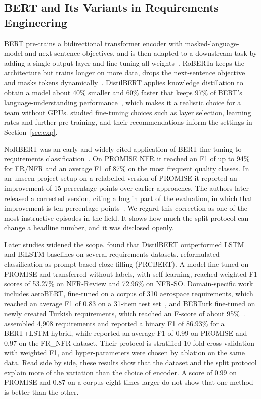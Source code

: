 \documentclass[conference,10pt,letterpaper]{IEEEtran}
\begin{document}
\subsection{BERT and Its Variants in Requirements Engineering}
BERT pre-trains a bidirectional transformer encoder with masked-language-model and next-sentence objectives, and is then adapted to a downstream task by adding a single output layer and fine-tuning all weights~\cite{devlin2019}. RoBERTa keeps the architecture but trains longer on more data, drops the next-sentence objective and masks tokens dynamically~\cite{liu2019roberta}. DistilBERT applies knowledge distillation to obtain a model about 40\% smaller and 60\% faster that keeps 97\% of BERT's language-understanding performance~\cite{sanh2019distilbert}, which makes it a realistic choice for a team without GPUs. \textcite{sun2019finetune} studied fine-tuning choices such as layer selection, learning rates and further pre-training, and their recommendations inform the settings in Section~\ref{sec:exp}.

NoRBERT was an early and widely cited application of BERT fine-tuning to requirements classification~\cite{hey2020norbert}. On PROMISE NFR it reached an F1 of up to 94\% for FR/NFR and an average F1 of 87\% on the most frequent quality classes. In an unseen-project setup on a relabelled version of PROMISE it reported an improvement of 15 percentage points over earlier approaches. The authors later released a corrected version, citing a bug in part of the evaluation, in which that improvement is ten percentage points~\cite{hey2022corrected}. We regard this correction as one of the most instructive episodes in the field. It shows how much the split protocol can change a headline number, and it was disclosed openly.

Later studies widened the scope. \textcite{kici2021} found that DistilBERT outperformed LSTM and BiLSTM baselines on several requirements datasets. \textcite{luo2022prcbert} reformulated classification as prompt-based cloze filling (PRCBERT). A model fine-tuned on PROMISE and transferred without labels, with self-learning, reached weighted F1 scores of 53.27\% on NFR-Review and 72.96\% on NFR-SO. Domain-specific work includes aeroBERT, fine-tuned on a corpus of 310 aerospace requirements, which reached an average F1 of 0.83 on a 31-item test set~\cite{tikayatray2023}, and BERTurk fine-tuned on newly created Turkish requirements, which reached an F-score of about 95\%~\cite{yucalar2023}. \textcite{alsanoosy2026} assembled 4,908 requirements and reported a binary F1 of 86.93\% for a BERT+LSTM hybrid, while \textcite{eltahier2025} reported an average F1 of 0.99 on PROMISE and 0.97 on the FR\_NFR dataset. Their protocol is stratified 10-fold cross-validation with weighted F1, and hyper-parameters were chosen by ablation on the same data. Read side by side, these results show that the dataset and the split protocol explain more of the variation than the choice of encoder. A score of 0.99 on PROMISE and 0.87 on a corpus eight times larger do not show that one method is better than the other.
\end{document}
